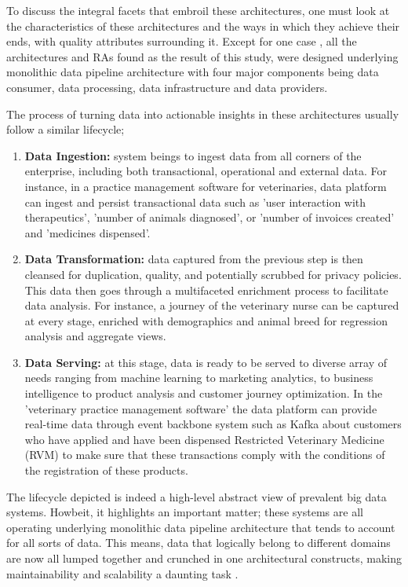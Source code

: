 \documentclass[review]{elsarticle}
\begin{document}
To discuss the integral facets that embroil these architectures, one must look at the characteristics of these architectures and the ways in which they achieve their ends, with quality attributes surrounding it. Except for one case \cite{AtaeiApsec}, all the architectures and RAs found as the result of this study, were designed underlying monolithic data pipeline architecture with four major components being data consumer, data processing, data infrastructure and data providers. 

The process of turning data into actionable insights in these architectures usually follow a similar lifecycle;

\begin{enumerate}
    \item \textbf{Data Ingestion:} system beings to ingest data from all corners of the enterprise, including both transactional, operational and external data. For instance, in a practice management software for veterinaries, data platform can ingest and persist transactional data such as 'user interaction with therapeutics', 'number of animals diagnosed', or 'number of invoices created' and 'medicines dispensed'.
    \item \textbf{Data Transformation:} data captured from the previous step is then cleansed for duplication, quality, and potentially scrubbed for privacy policies. This data then goes through a multifaceted enrichment process to facilitate data analysis. For instance, a journey of the veterinary nurse can be captured at every stage, enriched with demographics and animal breed for regression analysis and aggregate views.
    \item \textbf{Data Serving:} at this stage, data is ready to be served to diverse array of needs ranging from machine learning to marketing analytics, to business intelligence to product analysis and customer journey optimization. In the 'veterinary practice management software' the data platform can provide real-time data through event backbone system such as Kafka  about customers who have applied and have been dispensed Restricted Veterinary Medicine (RVM) to make sure that these transactions comply with the conditions of the registration of these products.
\end{enumerate}

The lifecycle depicted is indeed a high-level abstract view of prevalent big data systems. Howbeit, it highlights an important matter; these systems are all operating underlying monolithic data pipeline architecture that tends to account for all sorts of data. This means, data that logically belong to different domains are now all lumped together and crunched in one architectural constructs, making maintainability and scalability a daunting task \cite{monolithToMesh}. 
\end{document}

